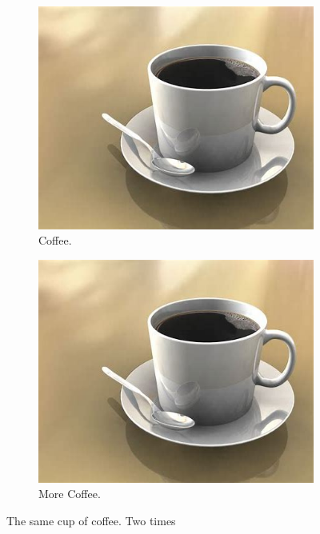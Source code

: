 \documentclass{article}
\begin{document}
	\begin{figure}[h!]
		\centering
		\begin{subfigure}[b]{0.4\linewidth}
			\includegraphics[width=\linewidth]{coffee.jpg}
			\caption{Coffee.}
			\end{subfigure}
		\begin{subfigure}[b]{0.4\linewidth}
				\includegraphics[width=\linewidth]{coffee.jpg}
			\caption{More Coffee.}
		\end{subfigure}
	\caption{The same cup of coffee. Two times}
	\end{figure}
\end{document}
